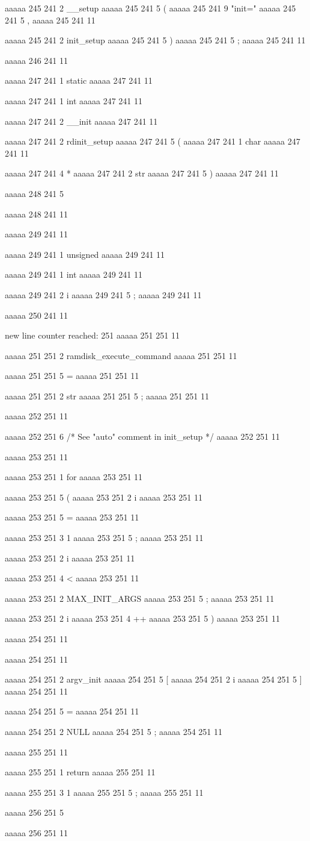 aaaaa 245 241
2
__setup
aaaaa 245 241
5
(
aaaaa 245 241
9
"init="
aaaaa 245 241
5
,
aaaaa 245 241
11
 
aaaaa 245 241
2
init_setup
aaaaa 245 241
5
)
aaaaa 245 241
5
;
aaaaa 245 241
11


aaaaa 246 241
11


aaaaa 247 241
1
static
aaaaa 247 241
11
 
aaaaa 247 241
1
int
aaaaa 247 241
11
 
aaaaa 247 241
2
__init
aaaaa 247 241
11
 
aaaaa 247 241
2
rdinit_setup
aaaaa 247 241
5
(
aaaaa 247 241
1
char
aaaaa 247 241
11
 
aaaaa 247 241
4
*
aaaaa 247 241
2
str
aaaaa 247 241
5
)
aaaaa 247 241
11


aaaaa 248 241
5
{
aaaaa 248 241
11


aaaaa 249 241
11
	
aaaaa 249 241
1
unsigned
aaaaa 249 241
11
 
aaaaa 249 241
1
int
aaaaa 249 241
11
 
aaaaa 249 241
2
i
aaaaa 249 241
5
;
aaaaa 249 241
11


aaaaa 250 241
11


new line counter reached: 251
aaaaa 251 251
11
	
aaaaa 251 251
2
ramdisk_execute_command
aaaaa 251 251
11
 
aaaaa 251 251
5
=
aaaaa 251 251
11
 
aaaaa 251 251
2
str
aaaaa 251 251
5
;
aaaaa 251 251
11


aaaaa 252 251
11
	
aaaaa 252 251
6
/* See "auto" comment in init_setup */
aaaaa 252 251
11


aaaaa 253 251
11
	
aaaaa 253 251
1
for
aaaaa 253 251
11
 
aaaaa 253 251
5
(
aaaaa 253 251
2
i
aaaaa 253 251
11
 
aaaaa 253 251
5
=
aaaaa 253 251
11
 
aaaaa 253 251
3
1
aaaaa 253 251
5
;
aaaaa 253 251
11
 
aaaaa 253 251
2
i
aaaaa 253 251
11
 
aaaaa 253 251
4
<
aaaaa 253 251
11
 
aaaaa 253 251
2
MAX_INIT_ARGS
aaaaa 253 251
5
;
aaaaa 253 251
11
 
aaaaa 253 251
2
i
aaaaa 253 251
4
++
aaaaa 253 251
5
)
aaaaa 253 251
11


aaaaa 254 251
11
	
aaaaa 254 251
11
	
aaaaa 254 251
2
argv_init
aaaaa 254 251
5
[
aaaaa 254 251
2
i
aaaaa 254 251
5
]
aaaaa 254 251
11
 
aaaaa 254 251
5
=
aaaaa 254 251
11
 
aaaaa 254 251
2
NULL
aaaaa 254 251
5
;
aaaaa 254 251
11


aaaaa 255 251
11
	
aaaaa 255 251
1
return
aaaaa 255 251
11
 
aaaaa 255 251
3
1
aaaaa 255 251
5
;
aaaaa 255 251
11


aaaaa 256 251
5
}
aaaaa 256 251
11


